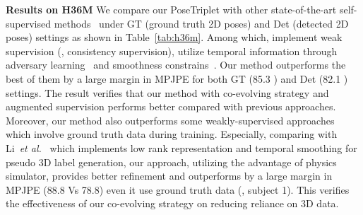 \documentclass[10pt,twocolumn,letterpaper]{article}
\newcommand{\nameofmethod}{PoseTriplet}
\newcommand{\et}{\emph{et al.}}
\begin{document}
\noindent \textbf{Results on H36M} 
We compare our \nameofmethod{} with other state-of-the-art self-supervised methods~\cite{rhodin2018unsupervised, chen2019unsupervised, kundu2020self, yu2021towards, hu2021unsupervised} under GT (ground truth 2D poses) and Det (detected 2D poses) settings as shown in Table~\ref{tab:h36m}.
Among which, 
\cite{rhodin2018unsupervised,chen2019unsupervised,kundu2020self} implement weak supervision (\ie, consistency supervision),
\cite{yu2021towards,hu2021unsupervised} utilize  temporal information through adversary learning~\cite{yu2021towards} and smoothness constrains~\cite{hu2021unsupervised}.
Our method outperforms the best of them by a large margin in MPJPE for both GT (85.3 ) and Det (82.1 ) settings.
The result verifies that our method with co-evolving strategy and augmented supervision performs better compared with previous approaches.
{Moreover, our method also outperforms some weakly-supervised approaches~\cite{wu2016single, tung_aign, li2019boosting, iqbal2020weakly} which involve ground truth data during training. 
Especially, comparing with Li~\et~\cite{li2019boosting} which implements low rank representation and temporal smoothing for pseudo 3D label generation,
our approach, utilizing the advantage of physics simulator, provides better refinement and outperforms \cite{li2019boosting} by a large margin in MPJPE (88.8 Vs 78.8) even it use ground truth data (\ie, subject 1). 
This verifies the effectiveness of our co-evolving strategy on reducing reliance on 3D data.}
\end{document}
